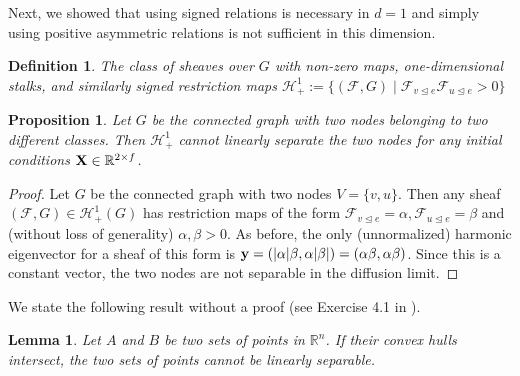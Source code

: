 \documentclass{article}
\newtheorem{lemma}[theorem]{Lemma}
\newtheorem{proposition}[theorem]{Proposition}
\newtheorem{definition}[theorem]{Definition}
\def\vy{{\bf{y}}}
\def\mX{{\bf{X}}}
\def\gF{{\mathcal{F}}}
\def\gH{{\mathcal{H}}}
\def\sR{{\mathbb{R}}}
\newcommand{\tleq}{\trianglelefteq}
\begin{document}
Next, we showed that using signed relations is necessary in $d=1$ and simply using positive asymmetric relations is not sufficient in this dimension. 

\begin{definition}
The class of sheaves over $G$ with non-zero maps, one-dimensional stalks, and similarly signed restriction maps $\gH^1_\mathrm{+} := \{ (\gF, G) \mid \gF_{v \tleq e} \gF_{u \tleq e} > 0\} $
\end{definition}

\begin{proposition}\label{prop:h1_with_same_sign}
Let $G$ be the connected graph with two nodes belonging to two different classes. Then $\gH^1_\mathrm{+}$ cannot linearly separate the two nodes for any initial conditions $\mX \in \sR^{2 \times f}$. 
\end{proposition}

\begin{proof}
Let $G$ be the connected graph with two nodes $V = \{v, u\}$. Then any sheaf $(\gF, G) \in \gH_{+}^1(G)$ has restriction maps of the form $\gF_{v \tleq e} = \alpha, \gF_{u \tleq e} = \beta$ and (without loss of generality) $\alpha, \beta > 0$. As before, the only (unnormalized) harmonic eigenvector for a sheaf of this form is $\vy = (|\alpha| \beta, \alpha |\beta|) = (\alpha \beta, \alpha \beta)$. Since this is a constant vector, the two nodes are not separable in the diffusion limit. 
\end{proof}

We state the following result without a proof (see Exercise 4.1 in \citet{bishop}).  

\begin{lemma}\label{lemma:convex_hull_separability}
Let $A$ and $B$ be two sets of points in $\sR^n$. If their convex hulls intersect, the two sets of points cannot be linearly separable. 
\end{lemma}
\end{document}
